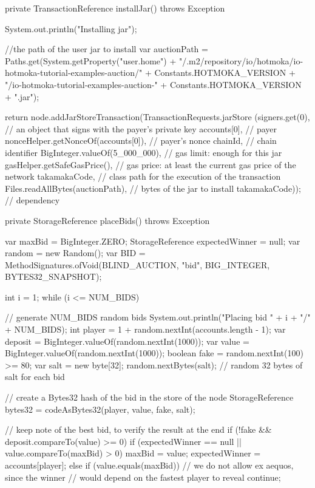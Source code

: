 \begin{codebox}
\begin{javalst}
{  private TransactionReference installJar() throws Exception {
    System.out.println("Installing jar");

    //the path of the user jar to install
    var auctionPath = Paths.get(System.getProperty("user.home")
      + "/.m2/repository/io/hotmoka/io-hotmoka-tutorial-examples-auction/"
      + Constants.HOTMOKA_VERSION
      + "/io-hotmoka-tutorial-examples-auction-" + Constants.HOTMOKA_VERSION + ".jar");

    return node.addJarStoreTransaction(TransactionRequests.jarStore
      (signers.get(0), // an object that signs with the payer's private key
      accounts[0], // payer
      nonceHelper.getNonceOf(accounts[0]), // payer's nonce
      chainId, // chain identifier
      BigInteger.valueOf(5_000_000), // gas limit: enough for this jar
      gasHelper.getSafeGasPrice(), // gas price: at least the current gas price of the network
      takamakaCode, // class path for the execution of the transaction
      Files.readAllBytes(auctionPath), // bytes of the jar to install
      takamakaCode)); // dependency
  }

  private StorageReference placeBids() throws Exception {
    var maxBid = BigInteger.ZERO;
    StorageReference expectedWinner = null;
    var random = new Random();
    var BID = MethodSignatures.ofVoid(BLIND_AUCTION, "bid", BIG_INTEGER, BYTES32_SNAPSHOT);

    int i = 1;
    while (i <= NUM_BIDS) { // generate NUM_BIDS random bids
      System.out.println("Placing bid " + i + "/" + NUM_BIDS);
      int player = 1 + random.nextInt(accounts.length - 1);
      var deposit = BigInteger.valueOf(random.nextInt(1000));
      var value = BigInteger.valueOf(random.nextInt(1000));
      boolean fake = random.nextInt(100) >= 80;
      var salt = new byte[32];
      random.nextBytes(salt); // random 32 bytes of salt for each bid

      // create a Bytes32 hash of the bid in the store of the node
      StorageReference bytes32 = codeAsBytes32(player, value, fake, salt);

      // keep note of the best bid, to verify the result at the end
      if (!fake && deposit.compareTo(value) >= 0)
        if (expectedWinner == null || value.compareTo(maxBid) > 0) {
          maxBid = value;
          expectedWinner = accounts[player];
        }
        else if (value.equals(maxBid))
          // we do not allow ex aequos, since the winner
          // would depend on the fastest player to reveal
          continue;

}}}
\end{javalst}
\end{codebox}

